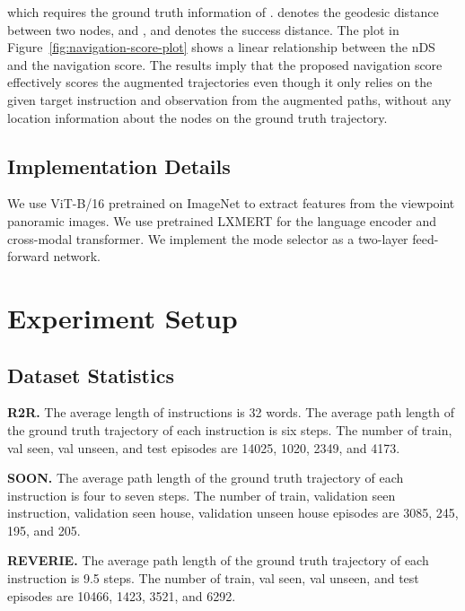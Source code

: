 \documentclass[10pt,twocolumn,letterpaper]{article}
\begin{document}
\noindent which requires the ground truth information of .  denotes the geodesic distance between two nodes,  and , and  denotes the success distance. The plot in Figure~\ref{fig:navigation-score-plot} shows a linear relationship between the nDS and the navigation score. The results imply that the proposed navigation score effectively scores the augmented trajectories even though it only relies on the given target instruction and observation from the augmented paths, without any location information about the nodes on the ground truth trajectory. 

\subsection{Implementation Details}
We use ViT-B/16 \cite{dosovitskiy2020vit} pretrained on ImageNet to extract
features from the viewpoint panoramic images. We use pretrained LXMERT \cite{tan2019lxmert} for the language encoder and cross-modal transformer. We implement the mode selector as a two-layer feed-forward network.



\section{Experiment Setup}\label{sec:experiment-setup}
\subsection{Dataset Statistics}
\noindent\textbf{R2R.} 
The average length of instructions is 32 words. The average path length of the ground truth trajectory of each instruction is six steps. The number of train, val seen, val unseen, and test episodes are \num[group-separator={,}]{14025}, 1020, 2349, and 4173.

\noindent\textbf{SOON.} \font=2.0pt
The average path length of the ground truth trajectory of each instruction is four to seven steps. The number of train, validation seen instruction, validation seen house, validation unseen house episodes are 3085, 245, 195, and 205.
\font=2.5pt

\noindent\textbf{REVERIE.} 
  The average path length of the ground truth trajectory of each instruction is
  9.5 steps. The number of train, val seen, val unseen, and test episodes are \num[group-separator={,}]{10466}, 1423, 3521, and 6292.
\end{document}
